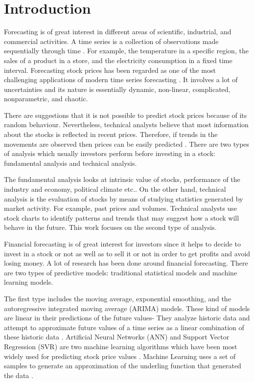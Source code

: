 \chapter{Introduction}
\label{ch:introsm}



Forecasting is of great interest in different areas of scientific, industrial, and commercial activities. A time series is a collection of observations made sequentially through time \cite{chatfield2000time}. For example, the temperature in a specific region, the sales of a product in a store, and the electricity consumption in a fixed time interval. Forecasting stock prices has been regarded as one of the most challenging applications of modern time series forecasting \cite{pai2005hybrid}. It involves a lot of uncertainties and its nature is essentially dynamic, non-linear, complicated, nonparametric, and chaotic.

There are suggestions that it is not possible to predict stock prices because of its random behaviour. Nevertheless, technical analysts believe that most information about the stocks is reflected in recent prices. Therefore, if trends in the movements are observed then prices can be easily predicted \cite{patel2015predicting}. There are two types of analysis which usually investors perform before investing in a stock: fundamental analysis and technical analysis.

The fundamental analysis looks at intrinsic value of stocks, performance of the industry and economy, political climate etc.. On the other hand, technical analysis is the evaluation of stocks by means of studying statistics generated by market activity. For example, past prices and volumes. Technical analysts use stock charts to identify patterns and trends that may suggest how a stock will behave in the future\cite{patel2015predicting}. This work focuses on the second type of analysis.

Financial forecasting is of great interest for investors since it helps to decide to invest in a stock or not as well as to sell it or not in order to get profits and avoid losing money. A lot of research has been done around financial forecasting. There are two types of predictive models: traditional statistical models and machine learning models.

The first type includes the moving average, exponential smoothing, and the  autoregressive integrated moving average (ARIMA) models. These kind of models are linear in their predictions of the future values- They analyze historic data and attempt to approximate future values of a time series as a linear combination of these historic data \cite{shah2014performance}. Artificial Neural Networks (ANN) and Support Vector Regression (SVR) are two machine learning algorithms which have been most widely used for predicting stock price values  \cite{patel2015predicting}. Machine Learning uses a set of samples to generate an approximation of the underling function that generated the data \cite{shah2014performance}.

